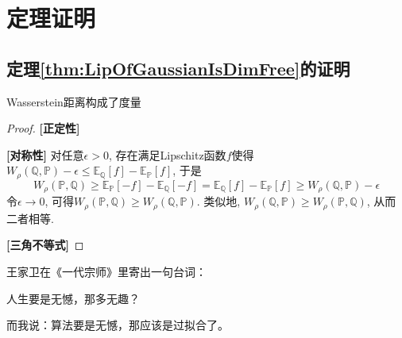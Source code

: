 \section{定理证明}

\subsection{定理\ref{thm:LipOfGaussianIsDimFree}的证明}



Wasserstein距离构成了度量

\begin{proof}

\textbf{[正定性]}

\textbf{[对称性]}
对任意$\epsilon > 0$, 存在满足Lipschitz函数$f$使得$W_{\rho}(\mathbb{Q}, \mathbb{P}) - \epsilon \leq \mathbb{E}_{\mathbb{Q}} [f]- \mathbb{E}_{\mathbb{P}} [f]$, 于是
\begin{equation*}
	W_{\rho}(\mathbb{P}, \mathbb{Q})
	\geq \mathbb{E}_{\mathbb{P}} [-f] - \mathbb{E}_{\mathbb{Q}} [-f] 
	= \mathbb{E}_{\mathbb{Q}} [f] - \mathbb{E}_{\mathbb{P}} [f]
	\geq W_{\rho}(\mathbb{Q}, \mathbb{P}) - \epsilon
\end{equation*}
令$\epsilon \to 0$, 可得$W_{\rho}(\mathbb{P}, \mathbb{Q}) \geq W_{\rho}(\mathbb{Q}, \mathbb{P})$.
类似地, $W_{\rho}(\mathbb{Q}, \mathbb{P}) \geq W_{\rho}(\mathbb{P}, \mathbb{Q})$, 从而二者相等. 

\textbf{[三角不等式]}

\end{proof}



王家卫在《一代宗师》里寄出一句台词：

人生要是无憾，那多无趣？

而我说：算法要是无憾，那应该是过拟合了。